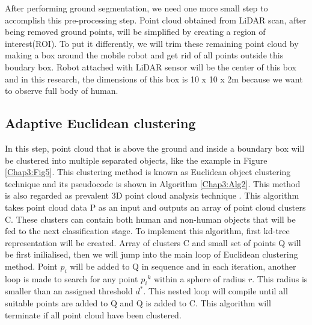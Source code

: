 After performing ground segmentation, we need one more small step to accomplish this pre-processing step. Point cloud obtained from
LiDAR scan, after being removed ground points, will be simplified by creating a region of interest(ROI). To put it
differently, we will trim these remaining point cloud by making a box around the mobile robot and get rid of all points outside
this boudary box\cite{cnn_uav}. Robot attached with LiDAR sensor will be the center of this box and in this research, the dimensions
of this box is 10 x 10 x 2m because we want to observe full body of human.


\subsection{Adaptive Euclidean clustering}
\label{Euclidean_cluster_section}

In this step,  point cloud that is above the ground and inside a boundary box will be clustered into multiple
separated objects, like the example in Figure \ref{Chap3:Fig5}. This clustering method is known as Euclidean
object clustering technique \cite{rusu_thesis,cnn_uav} and its pseudocode is shown in Algorithm \ref{Chap3:Alg2}.
This method is also regarded as prevalent 3D point cloud analysis technique \cite{3d_pc_analysis}.
This algorithm takes point cloud data P as an input and outputs an array of point cloud clusters C. These
clusters can contain both human and non-human objects that will be fed to the next classification stage.
To implement this algorithm, first kd-tree representation \cite{rusu_thesis} will be created. Array of clusters
C and small set of points Q will be first inilialised, then we will jump into the main loop of Euclidean clustering
method. Point $p_i$ will be added to Q in sequence and in each iteration, another loop is made to search
for any point ${p_i}^k$ within a sphere of radius $r$. This radius is smaller than an assigned threshold
$d^*$. This nested loop will compile until all suitable points are added to Q and Q is added to C. This algorithm
will terminate if all point cloud have been clustered.



